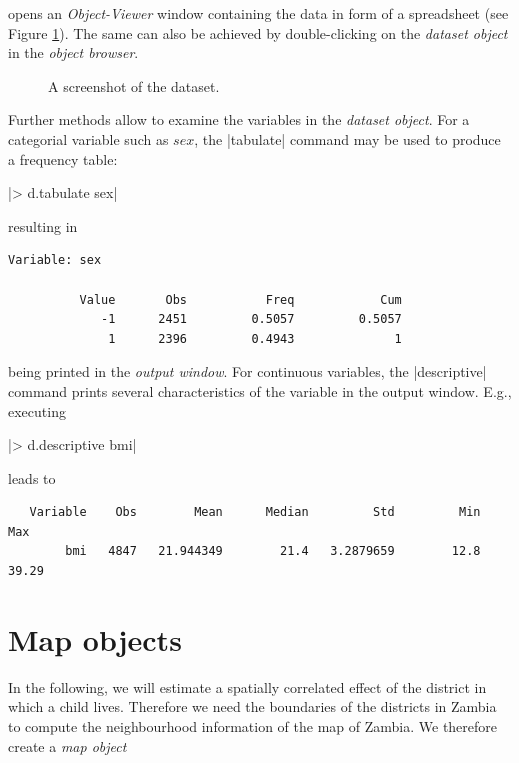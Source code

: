 opens an {\it Object-Viewer} window containing the data in form of a spreadsheet (see Figure \ref{step:screenshot}). The same
can also be achieved by double-clicking on the {\it dataset object} in the {\it object browser}.

\vspace{1cm}

\begin{figure}[ht]
\begin{center}
 {\it\caption{A
screenshot of the dataset.\label{step:screenshot}}}
\end{center}
\end{figure}

Further methods allow to examine the variables in the {\it dataset object}. For a categorial variable such as $\mathit{sex}$,
the |tabulate| command may be used to produce a frequency table:

|> d.tabulate sex|

resulting in

\begin{verbatim}
Variable: sex

          Value       Obs           Freq            Cum
             -1      2451         0.5057         0.5057
              1      2396         0.4943              1
\end{verbatim}

being printed in the {\it output window}. For continuous variables,  the |descriptive| command prints several characteristics
of the variable in the {output window}. E.g., executing

|> d.descriptive bmi|

leads to

\begin{verbatim}
   Variable    Obs        Mean      Median         Std         Min         Max
        bmi   4847   21.944349        21.4   3.2879659        12.8       39.29
\end{verbatim}

\section{Map objects}\label{step:maps}

In the following, we will estimate a spatially correlated effect of the district in which a child lives. Therefore we need the
boundaries of the districts in Zambia to compute the neighbourhood information of the map of Zambia. We therefore create a {\it
map object}

